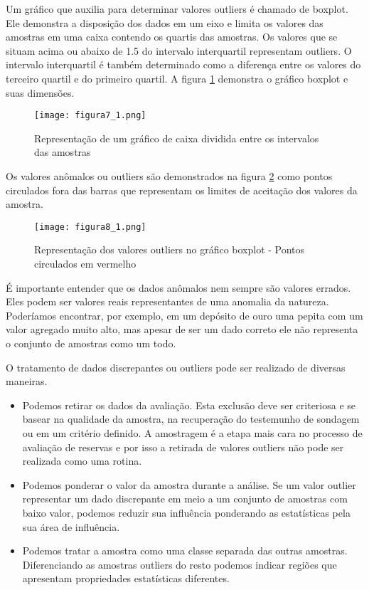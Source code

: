Um gráfico que auxilia para determinar valores outliers é chamado de boxplot. Ele demonstra a disposição dos dados em um eixo e limita os valores das amostras em uma caixa contendo os quartis das amostras. Os valores que se situam acima ou abaixo de 1.5 do intervalo interquartil representam outliers. O intervalo interquartil é também determinado como a diferença entre os valores do terceiro quartil e do primeiro quartil. A figura \ref{fig7_1} demonstra o gráfico boxplot e suas dimensões. 

\begin{figure}[H]
\centering
\texttt{[image: figura7\_1.png]}	
\caption{Representação de um gráfico de caixa dividida entre os intervalos das amostras }
\label{fig7_1}
\end{figure}

Os valores anômalos ou outliers são demonstrados na figura \ref{Fig8_1} como pontos circulados fora das barras que representam os limites de aceitação dos valores da amostra.

\begin{figure}[H]
	\centering
	\texttt{[image: figura8\_1.png]}	
	\caption{Representação dos valores outliers no gráfico boxplot - Pontos circulados em vermelho }
	\label{Fig8_1}
\end{figure}


 É importante entender que os dados anômalos nem sempre são valores errados. Eles podem ser valores reais representantes de uma anomalia da natureza. Poderíamos encontrar, por exemplo, em um depósito de ouro uma pepita com um valor agregado muito alto, mas apesar de ser um dado correto ele não representa o conjunto de amostras como um todo.

O tratamento de dados discrepantes ou outliers pode ser realizado de diversas maneiras.

\begin{itemize}
	
\item Podemos retirar os dados da avaliação. Esta exclusão deve ser criteriosa e se basear na  qualidade da amostra, na recuperação do testemunho de sondagem ou em um critério definido. A amostragem é a etapa mais cara no processo de avaliação de reservas e por isso a retirada de valores outliers não pode ser realizada como uma rotina.

\item Podemos ponderar o valor da amostra durante a análise. Se um valor outlier representar um dado discrepante em meio a um conjunto de amostras com baixo valor, podemos reduzir sua influência ponderando as estatísticas pela sua área de influência.

\item Podemos tratar a amostra como uma classe separada das outras amostras. Diferenciando as amostras outliers do resto podemos indicar regiões que apresentam propriedades estatísticas diferentes. 
\end{itemize}

